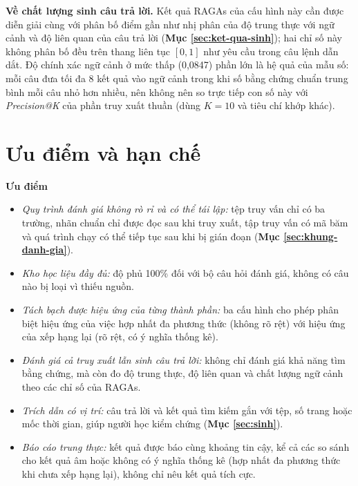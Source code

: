 \bigbreak\noindent
\textbf{Về chất lượng sinh câu trả lời.} Kết quả RAGAs của cấu hình này cần được diễn giải cùng với phân bố điểm gần như nhị phân của độ trung thực với ngữ cảnh và độ liên quan của câu trả lời (\textbf{Mục \ref{sec:ket-qua-sinh}}); hai chỉ số này không phân bố đều trên thang liên tục $[0,1]$ như yêu cầu trong câu lệnh dẫn dắt. Độ chính xác ngữ cảnh ở mức thấp (0,0847) phần lớn là hệ quả của mẫu số: mỗi câu đưa tối đa 8 kết quả vào ngữ cảnh trong khi số bằng chứng chuẩn trung bình mỗi câu nhỏ hơn nhiều, nên không nên so trực tiếp con số này với \textit{Precision@K} của phần truy xuất thuần (dùng $K = 10$ và tiêu chí khớp khác).


\section{Ưu điểm và hạn chế}

\textbf{Ưu điểm}
\begin{itemize}
    \item \textit{Quy trình đánh giá không rò rỉ và có thể tái lập:} tệp truy vấn chỉ có ba trường, nhãn chuẩn chỉ được đọc sau khi truy xuất, tập truy vấn có mã băm và quá trình chạy có thể tiếp tục sau khi bị gián đoạn (\textbf{Mục \ref{sec:khung-danh-gia}}).
    \item \textit{Kho học liệu đầy đủ:} độ phủ 100\% đối với bộ câu hỏi đánh giá, không có câu nào bị loại vì thiếu nguồn.
    \item \textit{Tách bạch được hiệu ứng của từng thành phần:} ba cấu hình cho phép phân biệt hiệu ứng của việc hợp nhất đa phương thức (không rõ rệt) với hiệu ứng của xếp hạng lại (rõ rệt, có ý nghĩa thống kê).
    \item \textit{Đánh giá cả truy xuất lẫn sinh câu trả lời:} không chỉ đánh giá khả năng tìm bằng chứng, mà còn đo độ trung thực, độ liên quan và chất lượng ngữ cảnh theo các chỉ số của RAGAs.
    \item \textit{Trích dẫn có vị trí:} câu trả lời và kết quả tìm kiếm gắn với tệp, số trang hoặc mốc thời gian, giúp người học kiểm chứng (\textbf{Mục \ref{sec:sinh}}).
    \item \textit{Báo cáo trung thực:} kết quả được báo cùng khoảng tin cậy, kể cả các so sánh cho kết quả âm hoặc không có ý nghĩa thống kê (hợp nhất đa phương thức khi chưa xếp hạng lại), không chỉ nêu kết quả tích cực.
\end{itemize}

